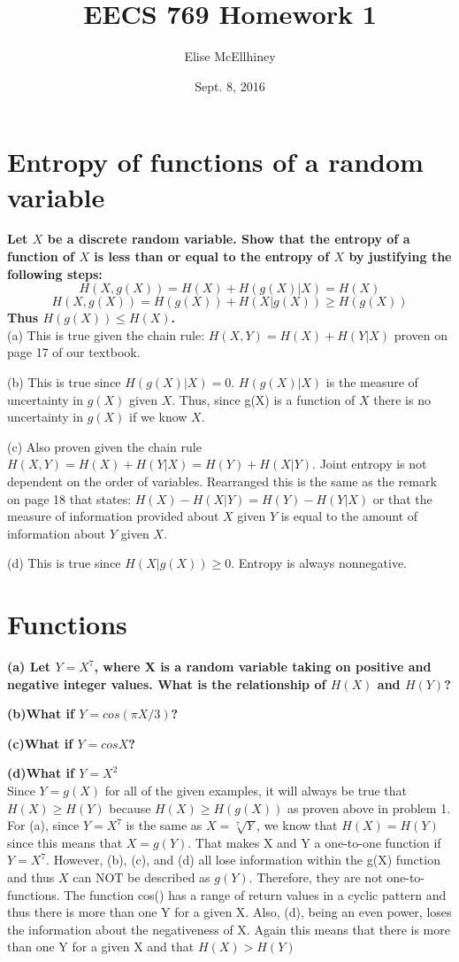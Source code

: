 \documentclass[11pt, oneside]{book}   	%
\title{EECS 769 Homework 1}
\author{Elise McEllhiney}
\date{Sept. 8, 2016}							%
\begin{document}
\maketitle
\section{Entropy of functions of a random variable}
\textbf{Let $X$ be a discrete random variable.  Show that the entropy of a function of $X$ is less than or equal to the entropy of $X$ by justifying the following steps:
$$H(X,g(X)) = H(X)+H(g(X)|X) = H(X)$$
$$H(X,g(X)) = H(g(X))+H(X|g(X))\geq H(g(X))$$
Thus $H(g(X)) \leq H(X)$.} \\

(a) This is true given the chain rule:  $H(X,Y)=H(X)+H(Y|X)$ proven on page 17 of our textbook.

(b) This is true since $H(g(X)|X)=0$.  $H(g(X)|X)$ is the measure of uncertainty in $g(X)$ given $X$.  Thus, since g(X) is a function of $X$ there is no uncertainty in $g(X)$ if we know $X$.

(c) Also proven given the chain rule $H(X,Y) = H(X)+H(Y|X) = H(Y)+H(X|Y)$.  Joint entropy is not dependent on the order of variables.  Rearranged this is the same as the remark on page 18 that states: $H(X)-H(X|Y)=H(Y)-H(Y|X)$ or that the measure of information provided about $X$ given $Y$ is equal to the amount of information about $Y$ given $X$.

(d) This is true since $H(X|g(X)) \geq 0$.  Entropy is always nonnegative.

\section{Functions}
\textbf{(a) Let $Y=X^7$, where X is a random variable taking on positive and negative integer values.  What is the relationship of $H(X)$ and $H(Y)$?}

\textbf{(b)What if $Y=cos( \pi X/3)$?}

\textbf{(c)What if $Y=cosX$?}

\textbf{(d)What if $Y=X^2$}\\

Since $Y=g(X)$ for all of the given examples, it will always be true that $H(X) \geq H(Y)$ because $H(X) \geq H(g(X))$ as proven above in problem 1.  For (a), since $Y=X^7$ is the same as $X= \sqrt [7] Y$, we know that $H(X)=H(Y)$ since this means that $X=g(Y)$.  That makes X and Y a one-to-one function if $Y=X^7$.  However, (b), (c), and (d) all lose information within the g(X) function and thus $X$ can NOT be described as $g(Y)$.  Therefore, they are not one-to-functions.  The function cos() has a range of return values in a cyclic pattern and thus there is more than one Y for a given X.  Also, (d), being an even power, loses the information about the negativeness of X.  Again this means that there is more than one Y for a given X and that $H(X)>H(Y)$
\end{document}
